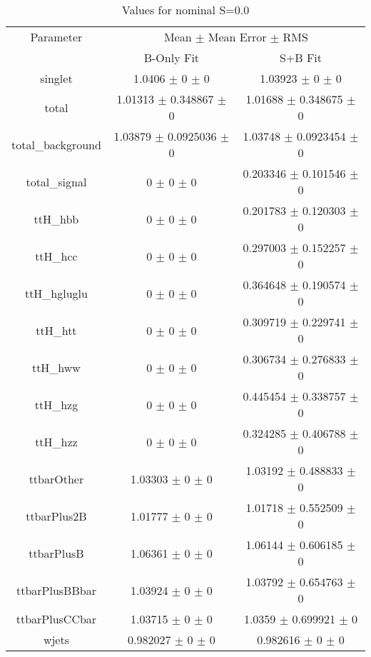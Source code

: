 \begin{table}
\centering
\caption{Values for nominal S=0.0}
\begin{tabular}{ccc}
\toprule
Parameter & \multicolumn{2}{c}{Mean $\pm$ Mean Error $\pm$ RMS}\\
 & B-Only Fit & S+B Fit\\
\midrule
singlet & \num{1.0406} $\pm$ \num{0} $\pm$ \num{0} & \num{1.03923} $\pm$ \num{0} $\pm$ \num{0}\\
total & \num{1.01313} $\pm$ \num{0.348867} $\pm$ \num{0} & \num{1.01688} $\pm$ \num{0.348675} $\pm$ \num{0}\\
total\_background & \num{1.03879} $\pm$ \num{0.0925036} $\pm$ \num{0} & \num{1.03748} $\pm$ \num{0.0923454} $\pm$ \num{0}\\
total\_signal & \num{0} $\pm$ \num{0} $\pm$ \num{0} & \num{0.203346} $\pm$ \num{0.101546} $\pm$ \num{0}\\
ttH\_hbb & \num{0} $\pm$ \num{0} $\pm$ \num{0} & \num{0.201783} $\pm$ \num{0.120303} $\pm$ \num{0}\\
ttH\_hcc & \num{0} $\pm$ \num{0} $\pm$ \num{0} & \num{0.297003} $\pm$ \num{0.152257} $\pm$ \num{0}\\
ttH\_hgluglu & \num{0} $\pm$ \num{0} $\pm$ \num{0} & \num{0.364648} $\pm$ \num{0.190574} $\pm$ \num{0}\\
ttH\_htt & \num{0} $\pm$ \num{0} $\pm$ \num{0} & \num{0.309719} $\pm$ \num{0.229741} $\pm$ \num{0}\\
ttH\_hww & \num{0} $\pm$ \num{0} $\pm$ \num{0} & \num{0.306734} $\pm$ \num{0.276833} $\pm$ \num{0}\\
ttH\_hzg & \num{0} $\pm$ \num{0} $\pm$ \num{0} & \num{0.445454} $\pm$ \num{0.338757} $\pm$ \num{0}\\
ttH\_hzz & \num{0} $\pm$ \num{0} $\pm$ \num{0} & \num{0.324285} $\pm$ \num{0.406788} $\pm$ \num{0}\\
ttbarOther & \num{1.03303} $\pm$ \num{0} $\pm$ \num{0} & \num{1.03192} $\pm$ \num{0.488833} $\pm$ \num{0}\\
ttbarPlus2B & \num{1.01777} $\pm$ \num{0} $\pm$ \num{0} & \num{1.01718} $\pm$ \num{0.552509} $\pm$ \num{0}\\
ttbarPlusB & \num{1.06361} $\pm$ \num{0} $\pm$ \num{0} & \num{1.06144} $\pm$ \num{0.606185} $\pm$ \num{0}\\
ttbarPlusBBbar & \num{1.03924} $\pm$ \num{0} $\pm$ \num{0} & \num{1.03792} $\pm$ \num{0.654763} $\pm$ \num{0}\\
ttbarPlusCCbar & \num{1.03715} $\pm$ \num{0} $\pm$ \num{0} & \num{1.0359} $\pm$ \num{0.699921} $\pm$ \num{0}\\
wjets & \num{0.982027} $\pm$ \num{0} $\pm$ \num{0} & \num{0.982616} $\pm$ \num{0} $\pm$ \num{0}\\
\bottomrule
\end{tabular}
\end{table}